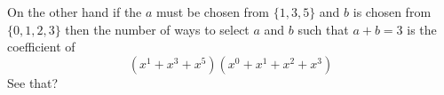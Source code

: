 On the other hand if the $a$ must be chosen from $\{1, 3, 5\}$ 
and $b$ is chosen from $\{0,1,2,3\}$ then the 
number of ways to select $a$ and $b$ such that $a + b = 3$
is the coefficient of 
\[
(x^1 + x^3 + x^5)(x^0 + x^1 + x^2 + x^3)
\]
See that?

















